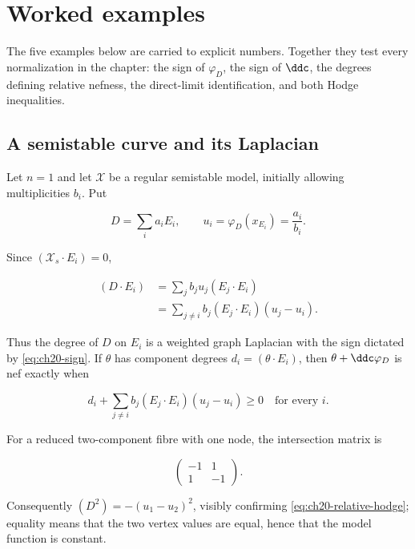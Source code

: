 \section{Worked examples}
\label{sec:ch20-examples}

The five examples below are carried to explicit numbers.  Together they test
every normalization in the chapter: the sign of \(\varphi_D\), the sign of
\(\ddc\), the degrees defining relative nefness, the direct-limit
identification, and both Hodge inequalities.

\subsection{A semistable curve and its Laplacian}
\label{sec:ch20-ex-curve}

\begin{example}
\label{ex:ch20-semistable-curve}
Let \(n=1\) and let \(\mathcal X\) be a regular semistable model, initially
allowing multiplicities \(b_i\).  Put

\begin{equation}
\label{eq:ch20-curve-values}
       D=\sum_i a_iE_i,
       \qquad u_i=\varphi_D(x_{E_i})=\frac{a_i}{b_i}.
\end{equation}

Since \((\mathcal X_s\cdot E_i)=0\),

\begin{equation}
\label{eq:ch20-graph-laplacian}
 \begin{aligned}
 (D\cdot E_i)
 &=\sum_j b_ju_j(E_j\cdot E_i)\\
 &=\sum_{j\neq i}b_j(E_j\cdot E_i)(u_j-u_i).
 \end{aligned}
\end{equation}

Thus the degree of \(D\) on \(E_i\) is a weighted graph Laplacian with the
sign dictated by \eqref{eq:ch20-sign}.  If \(\theta\) has component degrees
\(d_i=(\theta\cdot E_i)\), then \(\theta+\ddc\varphi_D\) is nef exactly
when

\begin{equation}
\label{eq:ch20-curve-nef-test}
 d_i+\sum_{j\neq i}b_j(E_j\cdot E_i)(u_j-u_i)\geq0
 \quad\text{for every }i.
\end{equation}

For a reduced two-component fibre with one node, the intersection matrix is

\begin{equation}
\label{eq:ch20-two-component-matrix}
              \begin{pmatrix}-1&1\\1&-1\end{pmatrix}.
\end{equation}

Consequently
\((D^2)=-(u_1-u_2)^2\), visibly confirming
\eqref{eq:ch20-relative-hodge}; equality means that the two vertex values
are equal, hence that the model function is constant.
\end{example}

